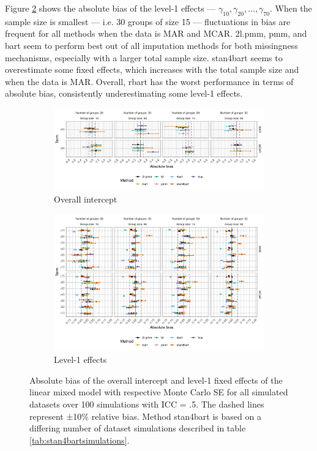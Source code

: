 \documentclass[3p,12pt,a4paper]{elsarticle}
\begin{document}
Figure \ref{fig:biaslevel1} shows the absolute bias of the level-1 effects --- $\gamma_{10}, \gamma_{20},\dots,\gamma_{70}$. When the sample size is smallest --- i.e. 30 groups of size 15 --- fluctuations in bias are frequent for all methods when the data is MAR and MCAR. 2l.pmm, pmm, and bart seem to perform best out of all imputation methods for both missingness mechanisms, especially with a larger total sample size. stan4bart seems to overestimate some fixed effects, which increases with the total sample size and when the data is MAR. Overall, rbart has the worst performance in terms of absolute bias, consistently underestimating some level-1 effects.

\begin{figure}[H]
    \centering 
    \begin{subfigure}[b]{1\textwidth}
        \centering
        \includegraphics[width=1\textwidth]{biasintercept.png}
        \caption{Overall intercept}
        \label{fig:biasintercept}
    \end{subfigure}
    \begin{subfigure}[b]{1\textwidth}
        \centering 
        \includegraphics[width=1\textwidth]{biaslevel1.png}
        \caption{Level-1 effects}
        \label{fig:biaslevel1}
    \end{subfigure}
    \caption{Absolute bias of the overall intercept and level-1 fixed effects of the linear mixed model with respective Monte Carlo SE for all simulated datasets over 100 simulations with ICC = .5. The dashed lines represent ±10\% relative bias. Method stan4bart is based on a differing number of dataset simulations described in table \ref{tab:stan4bartsimulations}.}
    \label{fig:biasinterceptlevel1}
\end{figure}
\end{document}

